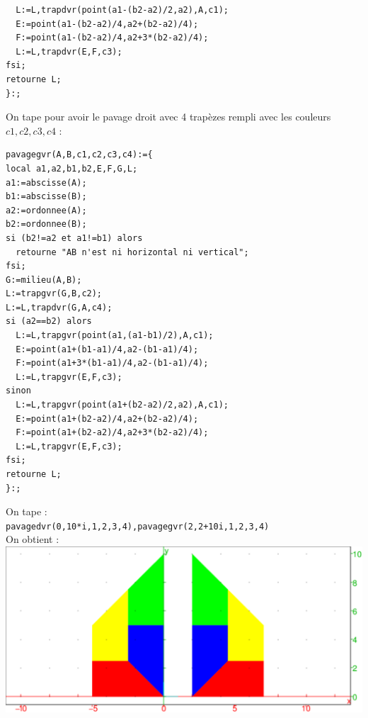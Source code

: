 \documentclass[a4paper,11pt]{book}
\begin{document}
\begin{itemize}
\begin{verbatim}
  L:=L,trapdvr(point(a1-(b2-a2)/2,a2),A,c1);
  E:=point(a1-(b2-a2)/4,a2+(b2-a2)/4);
  F:=point(a1-(b2-a2)/4,a2+3*(b2-a2)/4);
  L:=L,trapdvr(E,F,c3);
fsi;
retourne L;
}:;
\end{verbatim}
On tape pour avoir le pavage droit avec 4 trap\`ezes rempli avec les couleurs 
$c1,c2,c3,c4$ :
\begin{verbatim}
pavagegvr(A,B,c1,c2,c3,c4):={
local a1,a2,b1,b2,E,F,G,L;
a1:=abscisse(A);
b1:=abscisse(B);
a2:=ordonnee(A);
b2:=ordonnee(B);
si (b2!=a2 et a1!=b1) alors 
  retourne "AB n'est ni horizontal ni vertical"; 
fsi;
G:=milieu(A,B);
L:=trapgvr(G,B,c2);
L:=L,trapdvr(G,A,c4);
si (a2==b2) alors 
  L:=L,trapgvr(point(a1,(a1-b1)/2),A,c1);
  E:=point(a1+(b1-a1)/4,a2-(b1-a1)/4);
  F:=point(a1+3*(b1-a1)/4,a2-(b1-a1)/4);
  L:=L,trapgvr(E,F,c3);
sinon 
  L:=L,trapgvr(point(a1+(b2-a2)/2,a2),A,c1);
  E:=point(a1+(b2-a2)/4,a2+(b2-a2)/4);
  F:=point(a1+(b2-a2)/4,a2+3*(b2-a2)/4);
  L:=L,trapgvr(E,F,c3);
fsi;
retourne L;
}:;
\end{verbatim}
On tape :\\
{\tt pavagedvr(0,10*i,1,2,3,4),pavagegvr(2,2+10i,1,2,3,4)}\\
On obtient :\\
\includegraphics[width=\textwidth]{pavagedgv}


\end{itemize}
\end{document}
